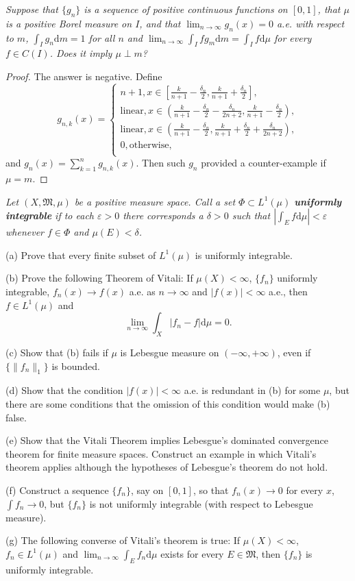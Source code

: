 \begin{problem}\em
Suppose that $\{g_n\}$ is a sequence of positive continuous functions on $[0,1]$, that $\mu$ is a positive Borel measure on $I$, and that $\lim_{n\to\infty}g_n(x)=0$ a.e. with respect to $m$, $\int_Ig_n\mathrm{d}m=1$ for all $n$ and $\lim_{n\to\infty}\int_Ifg_m\mathrm{d}m=\int_If\mathrm{d}\mu$ for every $f\in C(I)$. Does it imply $\mu\perp m$?
\end{problem}
\begin{proof}
The answer is negative. Define 
$$
g_{n,k}\left( x \right) =\begin{cases}
	n+1,x\in \left[ \frac{k}{n+1}-\frac{\delta _n}{2},\frac{k}{n+1}+\frac{\delta _n}{2} \right] ,\\
	\text{linear},x\in \left( \frac{k}{n+1}-\frac{\delta _n}{2}-\frac{\delta _n}{2n+2},\frac{k}{n+1}-\frac{\delta _n}{2} \right) ,\\
	\text{linear},x\in \left( \frac{k}{n+1}-\frac{\delta _n}{2},\frac{k}{n+1}+\frac{\delta _n}{2}+\frac{\delta _n}{2n+2} \right) ,\\
	0,\text{otherwise},\\
\end{cases}
$$
and $g_n(x)=\sum_{k=1}^ng_{n,k}(x)$. Then such $g_n$ provided a counter-example if $\mu=m$.
\end{proof}
\begin{problem}\em
Let $(X,\mathfrak{M},\mu)$ be a positive measure space. Call a set $\Phi\subset L^1(\mu)$ \textbf{uniformly integrable} if to each $\varepsilon>0$ there corresponds a $\delta>0$ such that $\left|\int_Ef\mathrm{d}\mu\right|<\varepsilon$ whenever $f\in\Phi$ and $\mu(E)<\delta$.\par
(a) Prove that every finite subset of $L^1(\mu)$ is uniformly integrable.\par
(b) Prove the following Theorem of Vitali: If $\mu(X)<\infty$, $\{f_n\}$ uniformly integrable, $f_n(x)\to f(x)$ a.e. as $n\to\infty$ and $|f(x)|<\infty$ a.e., then $f\in L^1(\mu)$ and 
$$
\lim_{n\rightarrow \infty} \int_X{\left| f_n-f \right|\mathrm{d}\mu}=0.
$$\par
(c) Show that (b) fails if $\mu$ is Lebesgue measure on $(-\infty,+\infty)$, even if $\{\|f_n\|_1\}$ is bounded.\par
(d) Show that the condition $|f(x)|<\infty$ a.e. is redundant in (b) for some $\mu$, but there are some conditions that the omission of this condition would make (b) false.\par
(e) Show that the Vitali Theorem implies Lebesgue's dominated convergence theorem for finite measure spaces. Construct an example in which Vitali's theorem applies although the hypotheses of Lebesgue's theorem do not hold.\par
(f) Construct a sequence $\{f_n\}$, say on $[0,1]$, so that $f_n(x)\to 0$ for every $x$, $\int f_n\to 0$, but $\{f_n\}$ is not uniformly integrable (with respect to Lebesgue measure).\par
(g) The following converse of Vitali's theorem is true: If $\mu(X)<\infty$, $f_n\in L^1(\mu)$ and $\lim_{n\to\infty}\int_Ef_n\mathrm{d}\mu$ exists for every $E\in\mathfrak{M}$, then $\{f_n\}$ is uniformly integrable.
\end{problem}

